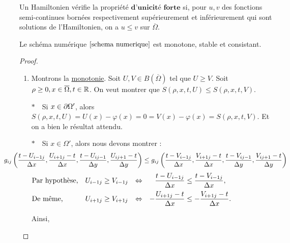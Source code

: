 \begin{definition}\label{unicite forte}
    Un Hamiltonien vérifie la propriété $\textbf{d'unicité forte}$ si, pour $u,v$ des fonctions semi-continues bornées respectivement supérieurement et inférieurement qui sont solutions de l'Hamiltonien, on a $u\leq v$ sur $\overline{\Omega}$.
\end{definition}

\begin{proposition}
    Le schéma numérique $\eqref{schema numerique}$ est monotone, stable et consistant.
\end{proposition}
\newpage

\begin{proof}~

    \begin{enumerate}    
        \item Montrons la \underline{monotonie}.
        Soit $U,V\in B(\overline{\Omega})$ tel que $U \geq V$. Soit $\rho\geq 0, x \in \overline{\Omega}, t\in \mathbb{R}$. On veut montrer que $S(\rho,x,t,U)\leq S(\rho,x,t,V)$.
        
        $\ast \quad$Si $x\in\mathop{}\!{\partial} \Omega'$, alors $S(\rho,x,t,U)=U(x)-\varphi(x)=0=V(x)-\varphi(x)=S(\rho,x,t,V)$. Et on a bien le résultat attendu.
        
        $\ast \quad$Si $x\in \Omega'$, alors nous devons montrer :
        \begin{equation*}
            \hspace{-1.5cm}g_{ij}\left(\frac{t-U_{i-1j}}{\Dx},\frac{U_{i+1j}-t}{\Dx},\frac{t-U_{ij-1}}{\Dy},\frac{U_{ij+1}-t}{\Dy}\right) \leq g_{ij}\left(\frac{t-V_{i-1j}}{\Dx},\frac{V_{i+1j}-t}{\Dx},\frac{t-V_{ij-1}}{\Dy},\frac{V_{ij+1}-t}{\Dy}\right)
        \end{equation*}
        \(
        \begin{array}{lccc}
            \hspace{-5pt}\text{Par hypothèse,} &U_{i-1j} \geq V_{i-1j} &\Leftrightarrow& \dfrac{t - U_{i-1j}}{\Delta x} \leq \dfrac{t - V_{i-1j}}{\Delta x}, \\[2ex]
            \hspace{-5pt}\text{De même, } &U_{i+1j} \geq V_{i+1j} &\Leftrightarrow& -\dfrac{U_{i+1j} - t}{\Delta x} \leq -\dfrac{V_{i+1j} - t}{\Delta x}.
        \end{array}
        \)
        
        Ainsi, 
        

\end{enumerate}
\end{proof}
